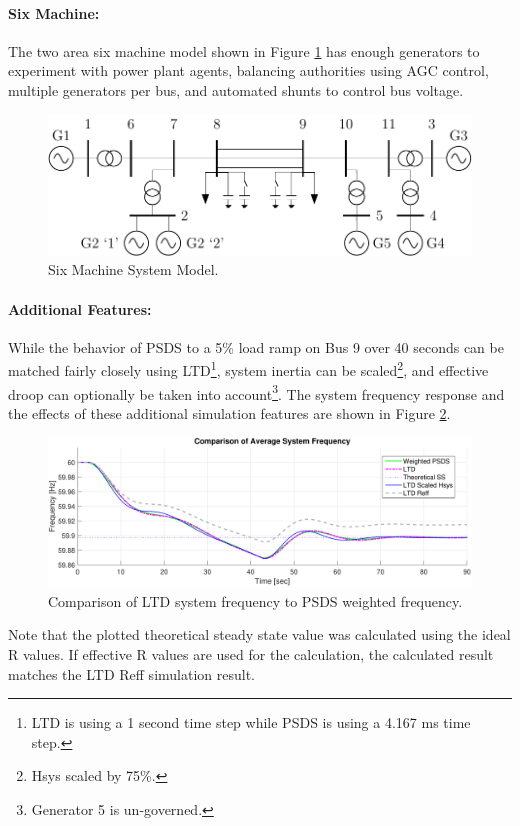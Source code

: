 \documentclass[12pt]{article}
\begin{document}
\pagebreak
\paragraph{Six Machine:} The two area six machine model shown in Figure \ref{system} has enough generators to experiment with power plant agents, balancing authorities using AGC control, multiple generators per bus, and automated shunts to control bus voltage.

\newcommand{\figW}{1}
\begin{figure}[h!]
	\centering
	\includegraphics[width=\figW\linewidth]{../../models/sixMachine/sixMachine}\vspace{-.5em}
	\caption{Six Machine System Model.}
	\label{system}		 
\end{figure}%

\paragraph{Additional Features:} While the behavior of PSDS to a 5\% load ramp on Bus 9 over 40 seconds can be matched fairly closely using LTD\footnote{LTD is using a 1 second time step while PSDS is using a 4.167 ms time step.}, system inertia can be scaled\footnote{Hsys scaled by 75\%.}, and effective droop can optionally be taken into account\footnote{Generator 5 is un-governed.}. The system frequency response and the effects of these additional simulation features are shown in Figure \ref{featureComp}. 


\begin{figure}[h!]
	\centering
	\includegraphics[width=\figW\linewidth]{HReffCompRamp}\vspace{-.5em}
	\caption{Comparison of LTD system frequency to PSDS weighted frequency.}
	\label{featureComp}		 
\end{figure}%

Note that the plotted theoretical steady state value was calculated using the ideal R values. If effective R values are used for the calculation, the calculated result matches the LTD Reff simulation result.
\end{document}
